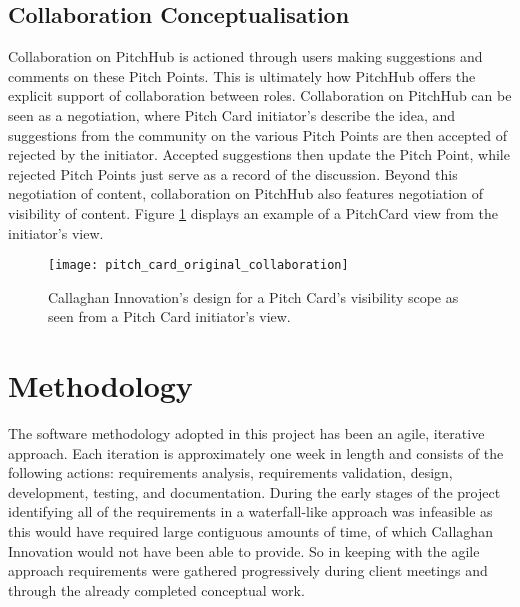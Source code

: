 \subsection{Collaboration Conceptualisation}
Collaboration on PitchHub is actioned through users making suggestions and comments on these Pitch Points. This is ultimately how PitchHub offers the explicit support of collaboration between roles. Collaboration on PitchHub can be seen as a negotiation, where Pitch Card initiator's describe the idea, and suggestions from the community on the various Pitch Points are then accepted of rejected by the initiator. Accepted suggestions then update the Pitch Point, while rejected Pitch Points just serve as a record of the discussion. Beyond this negotiation of content, collaboration on PitchHub also features negotiation of visibility of content. Figure \ref{fig:pitch_card_original_collaboration} displays an example of a PitchCard view from the initiator's view.
\begin{figure}[ht]
    \centering
    \texttt{[image: pitch\_card\_original\_collaboration]}
    \caption{Callaghan Innovation's design for a Pitch Card's visibility scope as seen from a Pitch Card initiator's view.}
    \label{fig:pitch_card_original_collaboration}
\end{figure}

\section{Methodology}
The software methodology adopted in this project has been an agile, iterative approach. Each iteration is approximately one week in length and consists of the following actions: requirements analysis, requirements validation, design, development, testing, and documentation. During the early stages of the project identifying all of the requirements in a waterfall-like approach was infeasible as this would have required large contiguous amounts of time, of which Callaghan Innovation would not have been able to provide. So in keeping with the agile approach requirements were gathered progressively during client meetings and through the already completed conceptual work. 

